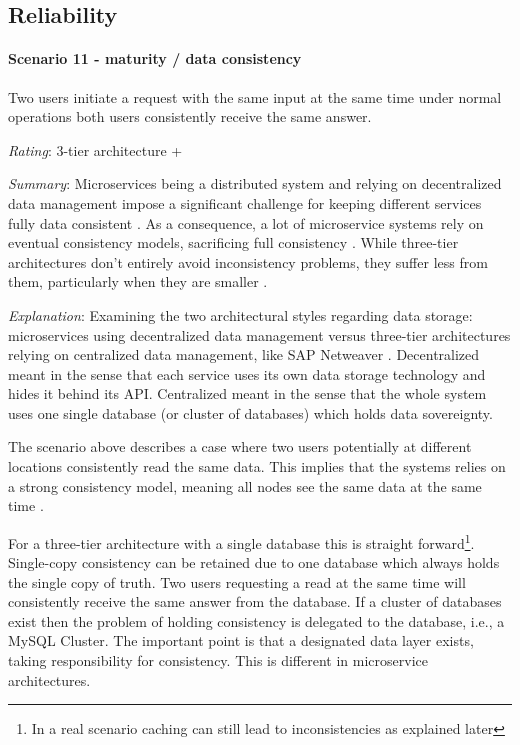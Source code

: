 \subsection{Reliability}
\label{quaMicro:reliability}
\paragraph{Scenario 11 - maturity / data consistency} Two users initiate a request with the same input at the same time under normal operations both users consistently receive the same answer. 
\label{quaMicro:s11}

\textit{Rating}: 3-tier architecture +

\textit{Summary}:
Microservices being a distributed system and relying on decentralized data management impose a significant challenge for keeping different services fully data consistent \citep[p. 36]{Wolff2016}.
As a consequence, a lot of microservice systems rely on eventual consistency models, sacrificing full consistency \citep[p. 235f.]{Newman2015}.
While three-tier architectures don't entirely avoid inconsistency problems, they suffer less from them, particularly when they are smaller \cite{FowlerTradeoffsConsistency2015}.

\textit{Explanation}:
Examining the two architectural styles regarding data storage: microservices using decentralized data management versus three-tier architectures relying on centralized data management, like SAP Netweaver \citep{FowlerDecentralizedData2014} \cite[p. 187]{Wolff2016}.
Decentralized meant in the sense that each service uses its own data storage technology and hides it behind its \ac{API}.
Centralized meant in the sense that the whole system uses one single database (or cluster of databases) which holds data sovereignty.

The scenario above describes a case where two users potentially at different locations consistently read the same data.
This implies that the systems relies on a strong consistency model, meaning all nodes see the same data at the same time \cite{Takada2013Abstractions}.

For a three-tier architecture with a single database this is straight forward\footnote{In a real scenario caching can still lead to inconsistencies as explained later}.
Single-copy consistency can be retained due to one database which always holds the single copy of truth.
Two users requesting a read at the same time will consistently receive the same answer from the database.
If a cluster of databases exist then the problem of holding consistency is delegated to the database, i.e., a MySQL Cluster.
The important point is that a designated data layer exists, taking responsibility for consistency. 
This is different in microservice architectures.

